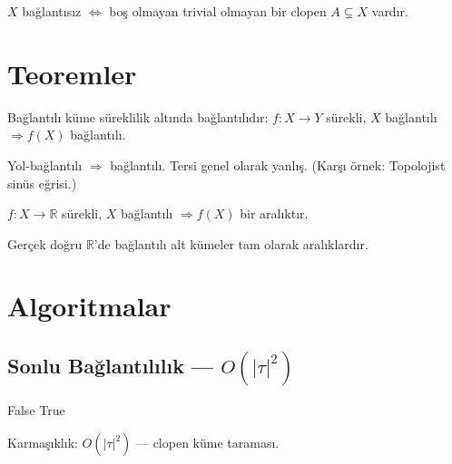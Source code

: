 $X$ bağlantısız $\Leftrightarrow$ boş olmayan trivial olmayan bir clopen $A \subsetneq X$ vardır.

\section{Teoremler}

\begin{theorem}
Bağlantılı küme süreklilik altında bağlantılıdır:
$f: X \to Y$ sürekli, $X$ bağlantılı $\Rightarrow f(X)$ bağlantılı.
\end{theorem}

\begin{theorem}
Yol-bağlantılı $\Rightarrow$ bağlantılı. Tersi genel olarak yanlış.
(Karşı örnek: Topolojist sinüs eğrisi.)
\end{theorem}

\begin{theorem}
$f: X \to \mathbb{R}$ sürekli, $X$ bağlantılı $\Rightarrow f(X)$ bir aralıktır.
\end{theorem}

\begin{theorem}
Gerçek doğru $\mathbb{R}$'de bağlantılı alt kümeler tam olarak aralıklardır.
\end{theorem}

\section{Algoritmalar}

\subsection{Sonlu Bağlantılılık — $O(|\tau|^2)$}

\begin{algorithm}
\caption{BagliMi$(X, \tau)$}
\begin{algorithmic}[1]
        \State \Return False 
    \EndIf
\EndFor
\State \Return True
\end{algorithmic}
\end{algorithm}

Karmaşıklık: $O(|\tau|^2)$ — clopen küme taraması.

